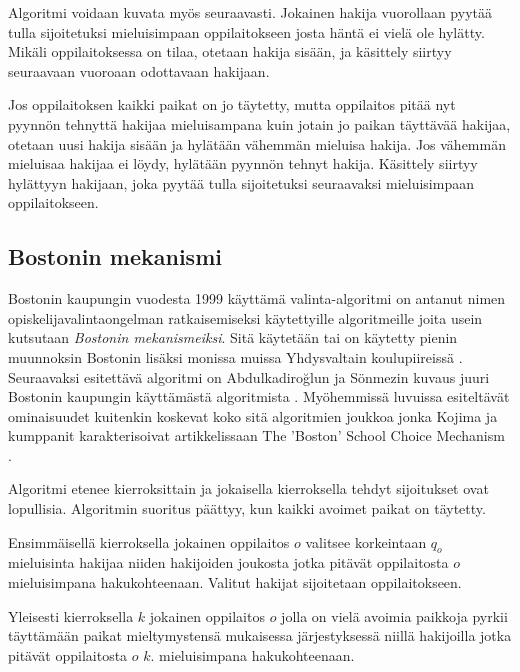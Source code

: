 \documentclass[gradu, twoside]{tktltiki}
\begin{document}
Algoritmi voidaan kuvata myös seuraavasti. Jokainen hakija vuorollaan
pyytää tulla sijoitetuksi mieluisimpaan oppilaitokseen josta häntä ei
vielä ole hylätty. Mikäli oppilaitoksessa on tilaa, otetaan hakija
sisään, ja käsittely siirtyy seuraavaan vuoroaan odottavaan hakijaan.

Jos oppilaitoksen kaikki paikat on jo täytetty, mutta oppilaitos pitää
nyt pyynnön tehnyttä hakijaa mieluisampana kuin jotain jo paikan
täyttävää hakijaa, otetaan uusi hakija sisään ja hylätään vähemmän
mieluisa hakija. Jos vähemmän mieluisaa hakijaa ei löydy, hylätään
pyynnön tehnyt hakija. Käsittely siirtyy hylättyyn hakijaan, joka
pyytää tulla sijoitetuksi seuraavaksi mieluisimpaan oppilaitokseen.

\subsection{Bostonin mekanismi}

Bostonin kaupungin vuodesta 1999 käyttämä valinta-algoritmi on antanut
nimen opiskelijavalintaongelman ratkaisemiseksi käytettyille
algoritmeille joita usein kutsutaan \emph{Bostonin mekanismeiksi}.
Sitä käytetään tai on käytetty pienin muunnoksin Bostonin lisäksi
monissa muissa Yhdysvaltain koulupiireissä \cite{abdusön03}.
Seuraavaksi esitettävä algoritmi on Abdulkadiroğlun ja Sönmezin kuvaus
juuri Bostonin kaupungin käyttämästä algoritmista \cite{abdusön03}.
Myöhemmissä luvuissa esiteltävät ominaisuudet kuitenkin koskevat koko
sitä algoritmien joukkoa jonka Kojima ja kumppanit karakterisoivat
artikkelissaan The 'Boston' School Choice Mechanism \cite{kojima10}.

Algoritmi etenee kierroksittain ja jokaisella kierroksella tehdyt
sijoitukset ovat lopullisia. Algoritmin suoritus päättyy, kun kaikki
avoimet paikat on täytetty.

\begin{itemize*}
\item Ensimmäisellä kierroksella jokainen oppilaitos $o$ valitsee
  korkeintaan $q_o$ mieluisinta hakijaa niiden hakijoiden joukosta
  jotka pitävät oppilaitosta $o$ mieluisimpana hakukohteenaan. Valitut
  hakijat sijoitetaan oppilaitokseen.

\item Yleisesti kierroksella $k$ jokainen oppilaitos $o$ jolla on
  vielä avoimia paikkoja pyrkii täyttämään paikat mieltymystensä
  mukaisessa järjestyksessä niillä hakijoilla jotka pitävät
  oppilaitosta $o$ $k.$ mieluisimpana hakukohteenaan.
\end{itemize*}
\end{document}
